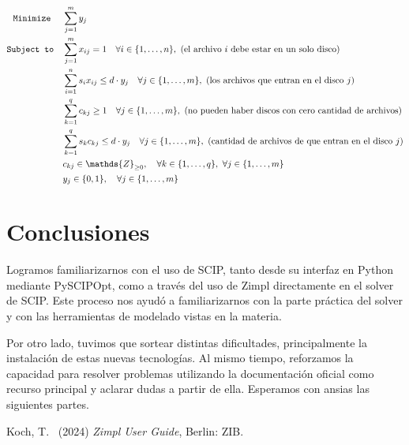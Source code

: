 \documentclass[11pt, a4paper, pdftex]{article}
\begin{document}
\begin{alignat*}{2}
	\minimize
	& \sum_{j = 1}^{m} y_{j}\\
	\subjto
	& \sum_{j = 1}^{m} x_{ij} = 1 \quad \forall i \in \{1, \ldots, n\},\ \text{(el archivo $i$ debe estar en un solo disco)}\\
	& \sum_{i = 1}^{n} s_{i} x_{ij} \le d\cdot y_{j} \quad \forall j \in \{1, \ldots, m\},\ \text{(los archivos que entran en el disco $j$)}\\
	& \sum_{k = 1}^{q} c_{kj} \ge 1 \quad \forall j \in \{1, \ldots, m\},\ \text{(no pueden haber discos con cero cantidad de archivos)}\\
	& \sum_{k = 1}^{q} s_{k} c_{kj} \le d\cdot y_{j} \quad \forall j \in \{1, \ldots, m\},\ \text{(cantidad de archivos de que entran en el disco $j$)}\\
	& c_{kj} \in \mathds{Z}_{\ge 0}, \quad \forall k \in \{1, \ldots, q\}, \ \forall j \in \{1, \ldots, m\}\\
	& y_{j} \in \{0,1\}, \quad \forall j \in \{1, \ldots, m\}
\end{alignat*}

\section{Conclusiones}

Logramos familiarizarnos con el uso de SCIP, tanto desde su interfaz en
Python mediante PySCIPOpt, como a través del uso de Zimpl directamente
en el solver de SCIP. Este proceso nos ayudó a familiarizarnos con la
parte práctica del solver y con las herramientas de modelado vistas en
la materia.

Por otro lado, tuvimos que sortear distintas dificultades,
principalmente la instalación de estas nuevas tecnologías. Al mismo
tiempo, reforzamos la capacidad para resolver problemas utilizando la
documentación oficial como recurso principal y aclarar dudas a partir de
ella. Esperamos con ansias las siguientes partes.

\begin{thebibliography}{99}
	Koch, T.\
	(2024)
	\emph{Zimpl User Guide},
	Berlin: ZIB.
\end{thebibliography}
\end{document}
